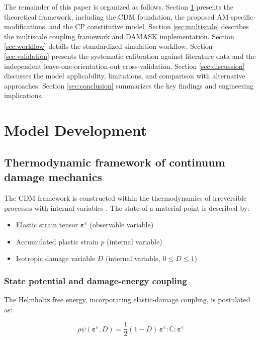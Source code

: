 \documentclass[12pt,a4paper,twocolumn]{article}
\begin{document}
The remainder of this paper is organized as follows. Section \ref{sec:model} presents the theoretical framework, including the CDM foundation, the proposed AM-specific modifications, and the CP constitutive model. Section \ref{sec:multiscale} describes the multiscale coupling framework and DAMASK implementation. Section \ref{sec:workflow} details the standardized simulation workflow. Section \ref{sec:validation} presents the systematic calibration against literature data and the independent leave-one-orientation-out cross-validation. Section \ref{sec:discussion} discusses the model applicability, limitations, and comparison with alternative approaches. Section \ref{sec:conclusion} summarizes the key findings and engineering implications.

\section{Model Development}
\label{sec:model}

\subsection{Thermodynamic framework of continuum damage mechanics}

The CDM framework is constructed within the thermodynamics of irreversible processes with internal variables \cite{lemaitre1992course}. The state of a material point is described by:

\begin{itemize}
    \item Elastic strain tensor $\boldsymbol{\varepsilon}^e$ (observable variable)
    \item Accumulated plastic strain $p$ (internal variable)
    \item Isotropic damage variable $D$ (internal variable, $0 \le D \le 1$)
\end{itemize}

\subsubsection{State potential and damage-energy coupling}

The Helmholtz free energy, incorporating elastic-damage coupling, is postulated as:

\begin{equation}
\rho\psi(\boldsymbol{\varepsilon}^e, D) = \frac{1}{2}(1-D) \, \boldsymbol{\varepsilon}^e : \mathbb{C} : \boldsymbol{\varepsilon}^e
\label{eq:free_energy}
\end{equation}
\end{document}
